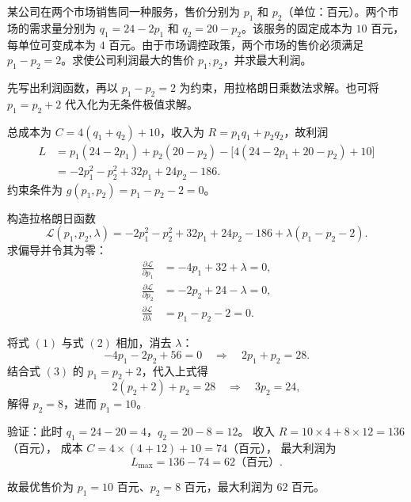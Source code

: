 \documentclass[answer]{THUExam}
\begin{document}
\begin{problem}
某公司在两个市场销售同一种服务，售价分别为 $p_1$ 和 $p_2$（单位：百元）。两个市场的需求量分别为 $q_1=24-2p_1$ 和 $q_2=20-p_2$。该服务的固定成本为 $10$ 百元，每单位可变成本为 $4$ 百元。由于市场调控政策，两个市场的售价必须满足 $p_1-p_2=2$。求使公司利润最大的售价 $p_1,p_2$，并求最大利润。
\end{problem}
\begin{note}
先写出利润函数，再以 $p_1-p_2=2$ 为约束，用拉格朗日乘数法求解。也可将 $p_1=p_2+2$ 代入化为无条件极值求解。
\end{note}
\begin{solution}
总成本为 $C=4(q_1+q_2)+10$，收入为 $R=p_1q_1+p_2q_2$，故利润
\begin{align*}
L&=p_1(24-2p_1)+p_2(20-p_2)-\bigl[4(24-2p_1+20-p_2)+10\bigr]\\
&=-2p_1^2-p_2^2+32p_1+24p_2-186.
\end{align*}
约束条件为 $g(p_1,p_2)=p_1-p_2-2=0$。

构造拉格朗日函数
\[
\mathcal{L}(p_1,p_2,\lambda)=-2p_1^2-p_2^2+32p_1+24p_2-186+\lambda(p_1-p_2-2).
\]
求偏导并令其为零：
\begin{align*}
\frac{\partial\mathcal{L}}{\partial p_1}&=-4p_1+32+\lambda=0,\tag{1}\\
\frac{\partial\mathcal{L}}{\partial p_2}&=-2p_2+24-\lambda=0,\tag{2}\\
\frac{\partial\mathcal{L}}{\partial\lambda}&=p_1-p_2-2=0.\tag{3}
\end{align*}

将式 $(1)$ 与式 $(2)$ 相加，消去 $\lambda$：
\[
-4p_1-2p_2+56=0\quad\Longrightarrow\quad 2p_1+p_2=28.
\]
结合式 $(3)$ 的 $p_1=p_2+2$，代入上式得
\[
2(p_2+2)+p_2=28\quad\Longrightarrow\quad 3p_2=24,
\]
解得 $p_2=8$，进而 $p_1=10$。

验证：此时 $q_1=24-20=4$，$q_2=20-8=12$。
收入 $R=10\times4+8\times12=136$（百元），
成本 $C=4\times(4+12)+10=74$（百元），
最大利润为
\[
L_{\max}=136-74=\boxed{62\text{（百元）}}.
\]

故最优售价为 $\boxed{p_1=10}$ 百元、$\boxed{p_2=8}$ 百元，最大利润为 $\boxed{62}$ 百元。
\end{solution}
\end{document}
